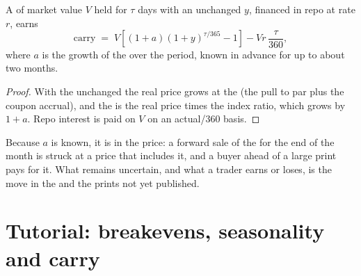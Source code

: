 \begin{proposition}\label{prop:m2:inflation-markets:carry}
A  of market value $V$ held for $\tau$ days with an unchanged 
$y$, financed in repo at rate $r$, earns
\[
\mathrm{carry} \;=\; V\left[(1+a)(1+y)^{\tau/365} - 1\right] - V r\,\frac{\tau}{360},
\]
where $a$ is the growth of the  over the period, known in
advance for up to about two months.
\end{proposition}

\begin{proof}
With the  unchanged the real price grows at the  (the
pull to par plus the coupon accrual), and the  is the real price
times the index ratio, which grows by $1+a$. Repo interest is paid on $V$ on an
actual/360 basis.
\end{proof}

Because $a$ is known, it is in the price: a forward sale of the  for the
end of the month is struck at a price that includes it, and a buyer ahead of a
large print pays for it. What remains uncertain, and what a trader earns or
loses, is the move in the  and the prints not yet published.

\section{Tutorial: breakevens, seasonality and carry}\label{tut:m2:inflation-markets:carry}

